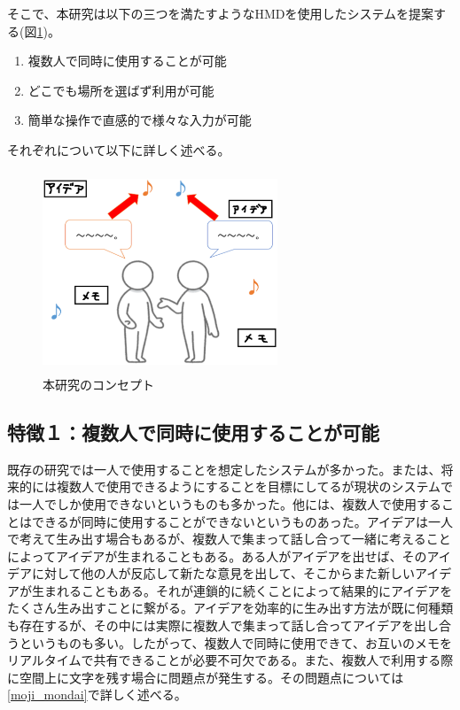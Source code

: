 \documentclass[11pt,a4j, titlepage]{jarticle} %
\begin{document}
そこで、本研究は以下の三つを満たすようなHMDを使用したシステムを提案する(図\ref{fig:concept})。

\begin{enumerate}[(1)]
 \item 複数人で同時に使用することが可能
 \item どこでも場所を選ばず利用が可能
 \item 簡単な操作で直感的で様々な入力が可能
\end{enumerate}

それぞれについて以下に詳しく述べる。

\begin{figure}[H]
  \begin{center}
    \includegraphics[clip,height=6.0cm,width=7.0cm]{./concept.eps}
    \caption{本研究のコンセプト}
    \label{fig:concept}
  \end{center}
\end{figure}

\subsection*{特徴１：複数人で同時に使用することが可能}
既存の研究では一人で使用することを想定したシステムが多かった。または、将来的には複数人で使用できるようにすることを目標にしてるが現状のシステムでは一人でしか使用できないというものも多かった。他には、複数人で使用することはできるが同時に使用することができないというものあった。アイデアは一人で考えて生み出す場合もあるが、複数人で集まって話し合って一緒に考えることによってアイデアが生まれることもある。ある人がアイデアを出せば、そのアイデアに対して他の人が反応して新たな意見を出して、そこからまた新しいアイデアが生まれることもある。それが連鎖的に続くことによって結果的にアイデアをたくさん生み出すことに繋がる。アイデアを効率的に生み出す方法が既に何種類も存在するが、その中には実際に複数人で集まって話し合ってアイデアを出し合うというものも多い。したがって、複数人で同時に使用できて、お互いのメモをリアルタイムで共有できることが必要不可欠である。また、複数人で利用する際に空間上に文字を残す場合に問題点が発生する。その問題点については\ref{moji_mondai}で詳しく述べる。
\end{document}
